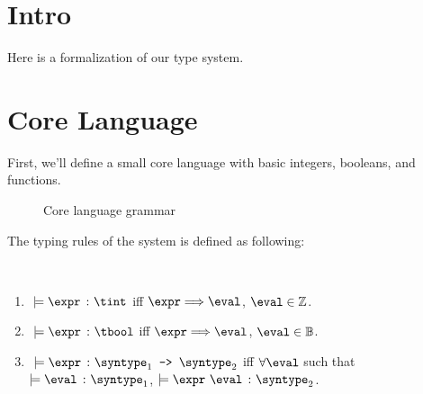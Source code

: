 \section{Intro}

Here is a formalization of our type system.

\section{Core Language}

First, we'll define a small core language with basic integers, booleans, and functions.

\begin{figure}[hbt!]%
  \begin{grammar}
            \grule[types]{\syntype}{
              \tint
              \gor \tbool
              \gor \tfun
          }
        \end{grammar}
    \caption{Core language grammar}
    \label{fig_Grammar}
\end{figure}

The typing rules of the system is defined as following:

\begin{definition}
  \label{def_typingRules}
  \ \par
  \begin{enumerate}
      \item $\ \models \hastype{\expr}{\tint}$ iff $\expr \bigstep \eval$, $\eval \in \mathbb{Z}$.
      \item $\ \models \hastype{\expr}{\tbool}$ iff $\expr \bigstep \eval$, $\eval \in \mathbb{B}$.
      \item $\ \models \hastype{\expr}{\mkfun{\syntype_1}{\syntype_2}}$ iff $\forall{\eval}$ such that $\models \hastype{\eval}{\syntype_1}$, $\models \hastype{\expr\ \eval}{\syntype_2}$.
   \end{enumerate}
\end{definition}

